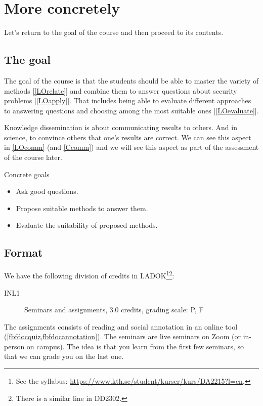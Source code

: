 \section{More concretely}

Let's return to the goal of the course and then proceed to its contents.

\subsection{The goal}

The goal of the course is that the students should be able to master the 
variety of methods [\ref{LOrelate}] and combine them to answer questions about 
security problems [\ref{LOapply}].
That includes being able to evaluate different approaches to answering 
questions and choosing among the most suitable ones [\ref{LOevaluate}].

Knowledge dissemination is about communicating results to others.
And in science, to convince others that one's results are correct.
We can see this aspect in \ref{LOcomm} (and \ref{Ccomm}) and we will see this 
aspect as part of the assessment of the course later.

\begin{frame}
  \begin{block}{Concrete goals}
    \begin{itemize}
      \item Ask good questions.
      \item Propose suitable methods to answer them.
      \item Evaluate the suitability of proposed methods.
    \end{itemize}
  \end{block}
\end{frame}


\subsection{Format}

We have the following division of credits in LADOK\footnote{%
  See the syllabus:
  \url{https://www.kth.se/student/kurser/kurs/DA2215?l=en}.
}\footnote{%
  There is a similar line in DD2302.
}:
\begin{description}
  \item[INL1] Seminars and assignments, 3.0 credits, grading scale: P, F
\end{description}

The assignments consists of reading and social annotation in an online tool 
(\cref{fbfdocquiz,fbfdocannotation}).
The seminars are live seminars on Zoom (or in-person on campus).
The idea is that you learn from the first few seminars, so that we can grade 
you on the last one.

